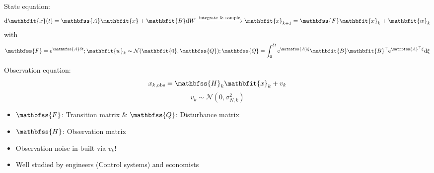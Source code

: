 \documentclass[hyperref={pdfpagelabels=false}]{beamer}
\begin{document}
\begin{frame}
  State equation: \begin{equation*}\label{eq:ARMAStateEq}
  \mathrm{d}\mathbfit{x}(t) = \mathbfss{A}\mathbfit{x} + \mathbfit{B}\mathrm{d}W \xrightarrow{\mathrm{integrate \ \& \ sample}} \mathbfit{x}_{k+1} = \mathbfss{F}\mathbfit{x}_{k} + \mathbfit{w}_{k} \end{equation*} 
    with
  \begin{equation*}\label{eq:ARMADisturbance} \mathbfss{F} = \mathrm{e}^{\mathbfss{A}\delta t}; \mathbfit{w}_{k} \sim \mathcal{N}(\mathbfit{0},\mathbfss{Q}); \mathbfss{Q} = \int_{0}^{\delta t} \mathrm{e}^{\mathbfss{A}\xi} \mathbfit{B} \mathbfit{B}^{\top} \mathrm{e}^{\mathbfss{A}^{\top}\xi} \mathrm{d} \xi
  \end{equation*}

  Observation equation: \begin{equation*}\label{eq:ARMAObsEqn} x_{k, \mathrm{obs}} = \mathbfss{H}_{k}\mathbfit{x}_{k} + v_{k} \end{equation*}
  \begin{equation*}\label{eq:ARMANoise} v_{k} \sim \mathcal{N}(0,\sigma^{2}_{N,k}) \end{equation*}

  \begin{itemize}
    \item $\mathbfss{F}$: Transition matrix \& $\mathbfss{Q}$: Disturbance matrix
    \item $\mathbfss{H}$: Observation matrix
    \item Observation noise in-built via $v_{k}$!
    \item Well studied by engineers (Control systems) and economists
  \end{itemize}
\end{frame}
\end{document}
